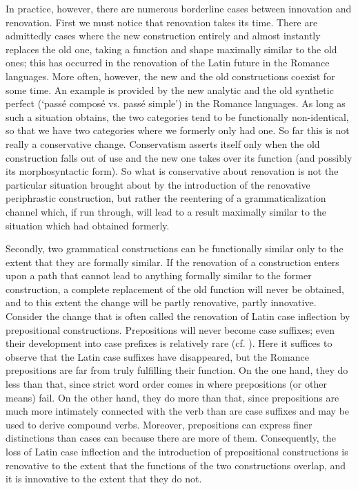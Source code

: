 In practice, however, there are numerous borderline cases between innovation and renovation. First we must notice that renovation takes its time. There are admittedly cases where the new construction entirely and almost instantly replaces the old one, taking a function and shape maximally similar to the old ones; this has occurred in the renovation of the Latin future in the Romance languages. More often, however, the new and the old constructions coexist for some time. An example is provided by the new analytic and the old synthetic perfect (‘passé composé vs. passé simple’) in the Romance languages. As long as such a situation obtains, the two categories tend to be functionally non-identical, so that we have two categories where we formerly only had one. So far this is not really a conservative change. Conservatism asserts itself only when the old construction falls out of use and the new one takes over its function (and possibly its morphosyntactic form). So what is conservative about renovation is not the particular situation brought about by the introduction of the renovative periphrastic construction, but rather the reentering of a grammaticalization channel which, if run through, will lead to a result maximally similar to the situation which had obtained formerly.

Secondly, two grammatical constructions can be functionally similar only to the extent that they are formally similar. If the renovation of a construction enters upon a path that cannot lead to anything formally similar to the former construction, a complete replacement of the old function will never be obtained, and to this extent the change will be partly renovative, partly innovative. Consider the change that is often called the renovation of Latin case inflection by prepositional constructions. Prepositions will never become case suffixes; even their development into case prefixes is relatively rare (cf. ). Here it suffices to observe that the Latin case suffixes have disappeared, but the Romance prepositions are far from truly fulfilling their function. On the one hand, they do less than that, since strict word order comes in where prepositions (or other means) fail. On the other hand, they do more than that, since prepositions are much more intimately connected with the verb than are case suffixes and may be used to derive compound verbs. Moreover, prepositions can express finer distinctions than cases can because there are more of them. Consequently, the loss of Latin case inflection and the introduction of prepositional constructions is renovative to the extent that the functions of the two constructions overlap, and it is innovative to the extent that they do not.

